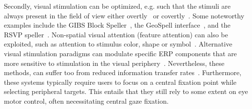 Secondly, visual stimulation can be optimized, e.g. such that the stimuli are always
present in the field of view either overtly~\cite{Acqualagna2013, Won2018,
Lin2018} or covertly~\cite{Treder2010,Pires2011,Lees2018}. Some noteworthy examples include the GIBS Block Speller~\parencite{Pires2011},
the GeoSpell interface~\parencite{Aloise2012}, and the RSVP
speller~\parencite{Acqualagna2011}.
Non-spatial visual attention (feature attention) can also be exploited, such as
attention to stimulus color, shape or symbol~\cite{Zhang2010,Treder2011,Hwang2015}.
Alternative visual stimulation paradigms can modulate specific ERP components
that are more sensitive to stimulation in the visual periphery~\cite{Schaeff2012,Xu2022}.
Nevertheless, these methods, can suffer too from reduced information
transfer rates~\cite{Chennu2013}.
Furthermore, these systems typically require users to focus on a central fixation point while
selecting peripheral targets.
This entails that they still rely to some extent on
eye motor control, often necessitating central gaze fixation.

